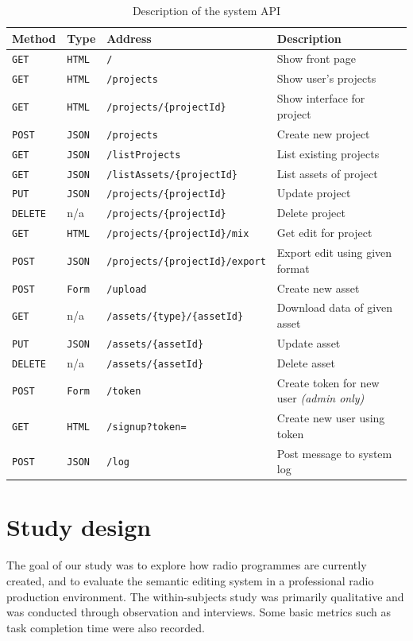 \begin{table}[ht]
\begin{tabular}{ l l l l }
Method & Type & Address & Description \\
\hline
\texttt{GET}    & \texttt{HTML} & \texttt{/} & Show front page \\ 
\texttt{GET}    & \texttt{HTML} & \texttt{/projects} & Show user's projects \\ 
\texttt{GET}    & \texttt{HTML} & \texttt{/projects/\{projectId\}} & Show
interface for project \\
\texttt{POST}   & \texttt{JSON} & \texttt{/projects} & Create new project \\
\texttt{GET}    & \texttt{JSON} & \texttt{/listProjects} & List existing
projects \\
\texttt{GET}    & \texttt{JSON} & \texttt{/listAssets/\{projectId\}} & List
assets of project \\
\texttt{PUT}    & \texttt{JSON} & \texttt{/projects/\{projectId\}} & Update
project \\
\texttt{DELETE} & n/a           & \texttt{/projects/\{projectId\}} & Delete
project \\
\texttt{GET}    & \texttt{HTML} & \texttt{/projects/\{projectId\}/mix} & Get
edit for project \\
\texttt{POST}   & \texttt{JSON} & \texttt{/projects/\{projectId\}/export} &
Export edit using given format \\
\texttt{POST}   & \texttt{Form} &\texttt{/upload} & Create new asset \\
\texttt{GET}    & n/a           & \texttt{/assets/\{type\}/\{assetId\}} &
Download data of given asset \\
\texttt{PUT}    & \texttt{JSON} & \texttt{/assets/\{assetId\}} & Update asset \\
\texttt{DELETE} & n/a           & \texttt{/assets/\{assetId\}} & Delete asset \\
\texttt{POST}   & \texttt{Form} & \texttt{/token} & Create token for new user
\textit{(admin only)} \\
\texttt{GET}    & \texttt{HTML} & \texttt{/signup?token=} & Create new user
using token \\
\texttt{POST}   & \texttt{JSON} & \texttt{/log} & Post message to system log \\
\end{tabular}
\caption{Description of the system API}
\end{table}

\section{Study design}
The goal of our study was to explore how radio programmes are currently
created, and to evaluate the semantic editing system in a professional radio
production environment.  The within-subjects study was primarily qualitative
and was conducted through observation and interviews. Some basic metrics such
as task completion time were also recorded.

